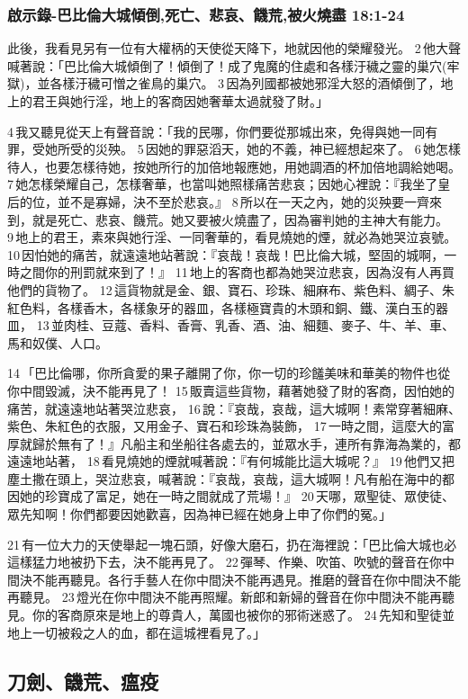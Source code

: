 \subsubsection{啟示錄-巴比倫大城傾倒,死亡、悲哀、饑荒,被火燒盡 18:1-24}
此後，我看見另有一位有大權柄的天使從天降下，地就因他的榮耀發光。 2 他大聲喊著說：「巴比倫大城傾倒了！傾倒了！成了鬼魔的住處和各樣汙穢之靈的巢穴(牢獄)，並各樣汙穢可憎之雀鳥的巢穴。 3 因為列國都被她邪淫大怒的酒傾倒了，地上的君王與她行淫，地上的客商因她奢華太過就發了財。」

4 我又聽見從天上有聲音說：「我的民哪，你們要從那城出來，免得與她一同有罪，受她所受的災殃。 5 因她的罪惡滔天，她的不義，神已經想起來了。 6 她怎樣待人，也要怎樣待她，按她所行的加倍地報應她，用她調酒的杯加倍地調給她喝。 7 她怎樣榮耀自己，怎樣奢華，也當叫她照樣痛苦悲哀；因她心裡說：『我坐了皇后的位，並不是寡婦，決不至於悲哀。』 8 所以在一天之內，她的災殃要一齊來到，就是死亡、悲哀、饑荒。她又要被火燒盡了，因為審判她的主神大有能力。 9 地上的君王，素來與她行淫、一同奢華的，看見燒她的煙，就必為她哭泣哀號。 10 因怕她的痛苦，就遠遠地站著說：『哀哉！哀哉！巴比倫大城，堅固的城啊，一時之間你的刑罰就來到了！』 11 地上的客商也都為她哭泣悲哀，因為沒有人再買他們的貨物了。 12 這貨物就是金、銀、寶石、珍珠、細麻布、紫色料、綢子、朱紅色料，各樣香木，各樣象牙的器皿，各樣極寶貴的木頭和銅、鐵、漢白玉的器皿， 13 並肉桂、豆蔻、香料、香膏、乳香、酒、油、細麵、麥子、牛、羊、車、馬和奴僕、人口。

14 「巴比倫哪，你所貪愛的果子離開了你，你一切的珍饈美味和華美的物件也從你中間毀滅，決不能再見了！ 15 販賣這些貨物，藉著她發了財的客商，因怕她的痛苦，就遠遠地站著哭泣悲哀， 16 說：『哀哉，哀哉，這大城啊！素常穿著細麻、紫色、朱紅色的衣服，又用金子、寶石和珍珠為裝飾， 17 一時之間，這麼大的富厚就歸於無有了！』凡船主和坐船往各處去的，並眾水手，連所有靠海為業的，都遠遠地站著， 18 看見燒她的煙就喊著說：『有何城能比這大城呢？』 19 他們又把塵土撒在頭上，哭泣悲哀，喊著說：『哀哉，哀哉，這大城啊！凡有船在海中的都因她的珍寶成了富足，她在一時之間就成了荒場！』 20 天哪，眾聖徒、眾使徒、眾先知啊！你們都要因她歡喜，因為神已經在她身上申了你們的冤。」

21 有一位大力的天使舉起一塊石頭，好像大磨石，扔在海裡說：「巴比倫大城也必這樣猛力地被扔下去，決不能再見了。 22 彈琴、作樂、吹笛、吹號的聲音在你中間決不能再聽見。各行手藝人在你中間決不能再遇見。推磨的聲音在你中間決不能再聽見。 23 燈光在你中間決不能再照耀。新郎和新婦的聲音在你中間決不能再聽見。你的客商原來是地上的尊貴人，萬國也被你的邪術迷惑了。 24 先知和聖徒並地上一切被殺之人的血，都在這城裡看見了。」

\subsection{刀劍、饑荒、瘟疫}
